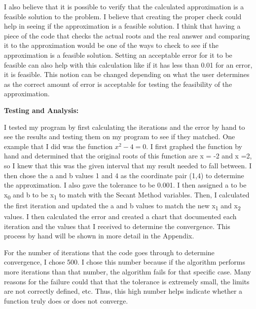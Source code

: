 \documentclass{article}
\begin{document}
{I also believe that it is possible to verify that the calculated approximation is a feasible solution to the problem.  I believe that creating the proper check could help in seeing if the approximation is a feasible solution. I think that having a piece of the code that checks the actual roots and the real answer and comparing it to the approximation would be one of the ways to check to see if the approximation is a feasible solution.  Setting an acceptable error for it to be feasible can also help with this calculation like if it has less than 0.01 for an error, it is feasible.  This notion can be changed depending on what the user determines as the correct amount of error is acceptable for testing the feasibility of the approximation.

}
\par \bigskip \par


{\bf Testing and Analysis:} {\color{black} I tested my program by first calculating the iterations and the error by hand to see the results and testing them on my program to see if they matched.  One example that I did was the function $x^2-4=0$.  I first graphed the function by hand and determined that the original roots of this function are x = -2 and x =2, so I knew that this was the given interval that my result needed to fall between.  I then chose the a and b values 1 and 4 as the coordinate pair (1,4) to determine the approximation.  I also gave the tolerance to be 0.001.  I then assigned a to be x\textsubscript{0} and b to be x\textsubscript{1} to match with the Secant Method variables.  Then, I calculated the first iteration and updated the a and b values to match the new x\textsubscript{1} and x\textsubscript{2} values.  I then calculated the error and created a chart that documented each iteration and the values that I received to determine the convergence.  This process by hand will be shown in more detail in the Appendix.  
\par \medskip
For the number of iterations that the code goes through to determine convergence, I chose 500.  I chose this number because if the algorithm performs more iterations than that number, the algorithm fails for that specific case.  Many reasons for the failure could that that the tolerance is extremely small, the limits are not correctly defined, etc.  Thus, this high number helps indicate whether a function truly does or does not converge.

}
\par \bigskip \par
\end{document}
